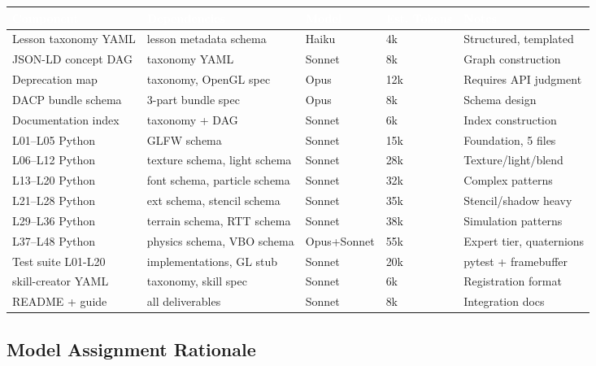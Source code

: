 \documentclass[11pt,letterpaper]{article}
\newcommand{\tableheader}[1]{\textbf{\sffamily\textcolor{white}{#1}}}
\begin{document}
\begin{center}
\begin{tabularx}{\textwidth}{L{3.5cm}L{3cm}L{1.8cm}L{2cm}X}
\toprule
{}
\tableheader{Component} & \tableheader{Dependencies} & \tableheader{Model} & \tableheader{Est. Tokens} & \tableheader{Notes} \\
\midrule
Lesson taxonomy YAML & lesson metadata schema & Haiku & 4k & Structured, templated \\
JSON-LD concept DAG & taxonomy YAML & Sonnet & 8k & Graph construction \\
Deprecation map & taxonomy, OpenGL spec & Opus & 12k & Requires API judgment \\
DACP bundle schema & 3-part bundle spec & Opus & 8k & Schema design \\
Documentation index & taxonomy + DAG & Sonnet & 6k & Index construction \\
L01--L05 Python & GLFW schema & Sonnet & 15k & Foundation, 5 files \\
L06--L12 Python & texture schema, light schema & Sonnet & 28k & Texture/light/blend \\
L13--L20 Python & font schema, particle schema & Sonnet & 32k & Complex patterns \\
L21--L28 Python & ext schema, stencil schema & Sonnet & 35k & Stencil/shadow heavy \\
L29--L36 Python & terrain schema, RTT schema & Sonnet & 38k & Simulation patterns \\
L37--L48 Python & physics schema, VBO schema & Opus+Sonnet & 55k & Expert tier, quaternions \\
Test suite L01-L20 & implementations, GL stub & Sonnet & 20k & pytest + framebuffer \\
skill-creator YAML & taxonomy, skill spec & Sonnet & 6k & Registration format \\
README + guide & all deliverables & Sonnet & 8k & Integration docs \\
\bottomrule
\end{tabularx}
\end{center}

\subsection{Model Assignment Rationale}
\end{document}
